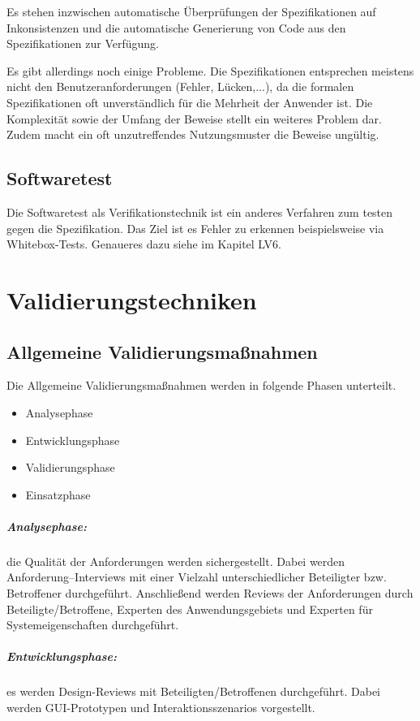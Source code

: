 Es stehen inzwischen automatische Überprüfungen der Spezifikationen auf Inkonsistenzen und die automatische Generierung von Code aus den Spezifikationen zur Verfügung. 

Es gibt allerdings noch einige Probleme. Die Spezifikationen entsprechen meistens nicht den Benutzeranforderungen (Fehler, Lücken,...), da die formalen Spezifikationen oft unverständlich für die Mehrheit der Anwender ist. Die Komplexität sowie der Umfang der Beweise stellt ein weiteres Problem dar. Zudem macht ein oft unzutreffendes Nutzungsmuster die Beweise ungültig.

\section{Softwaretest}
Die Softwaretest als Verifikationstechnik ist ein anderes Verfahren zum testen gegen die Spezifikation. Das Ziel ist es Fehler zu erkennen beispielsweise via Whitebox-Tests. Genaueres dazu siehe im Kapitel LV6.

\chapter{Validierungstechniken}
\section{Allgemeine Validierungsmaßnahmen}
Die Allgemeine Validierungsmaßnahmen werden in folgende Phasen unterteilt.
\begin{itemize}
\item Analysephase
\item Entwicklungsphase
\item Validierungsphase
\item Einsatzphase
\end{itemize}

\paragraph{Analysephase:} die Qualität der Anforderungen werden sichergestellt. Dabei werden Anforderung--Interviews mit einer Vielzahl unterschiedlicher Beteiligter bzw. Betroffener durchgeführt. Anschließend werden Reviews der Anforderungen durch Beteiligte/Betroffene, Experten des Anwendungsgebiets und Experten für Systemeigenschaften durchgeführt.

\paragraph{Entwicklungsphase: } es werden Design-Reviews mit Beteiligten/Betroffenen durchgeführt. Dabei werden GUI-Prototypen und Interaktionsszenarios vorgestellt.

